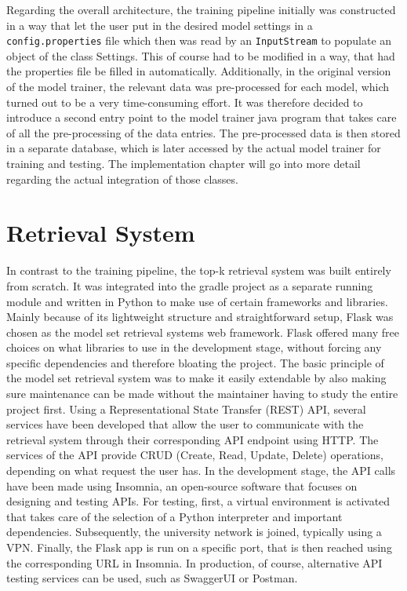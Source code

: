 Regarding the overall architecture, the training pipeline initially was constructed in a way that let the user put in the desired model settings in a \texttt{config.properties} file which then was read by an \texttt{InputStream} to populate an object of the class Settings. This of course had to be modified in a way, that had the properties file be filled in automatically. Additionally, in the original version of the model trainer, the relevant data was pre-processed for each model, which turned out to be a very time-consuming effort. It was therefore decided to introduce a second entry point to the model trainer java program that takes care of all the pre-processing of the data entries. The pre-processed data is then stored in a separate database, which is later accessed by the actual model trainer for training and testing. The implementation chapter will go into more detail regarding the actual integration of those classes.

\section{Retrieval System}

In contrast to the training pipeline, the top-k retrieval system was built entirely from scratch. It was integrated into the gradle project as a separate running module and written in Python to make use of certain frameworks and libraries. Mainly because of its lightweight structure and straightforward setup, Flask was chosen as the model set retrieval systems web framework. Flask offered many free choices on what libraries to use in the development stage, without forcing any specific dependencies and therefore bloating the project. The basic principle of the model set retrieval system was to make it easily extendable by also making sure maintenance can be made without the maintainer having to study the entire project first. Using a Representational State Transfer (REST) API, several services have been developed that allow the user to communicate with the retrieval system through their corresponding API endpoint using HTTP. The services of the API provide CRUD (Create, Read, Update, Delete) operations, depending on what request the user has. In the development stage, the API calls have been made using Insomnia, an open-source software that focuses on designing and testing APIs. For testing, first, a virtual environment is activated that takes care of the selection of a Python interpreter and important dependencies. Subsequently, the university network is joined, typically using a VPN. Finally, the Flask app is run on a specific port, that is then reached using the corresponding URL in Insomnia. In production, of course, alternative API testing services can be used, such as SwaggerUI or Postman.

